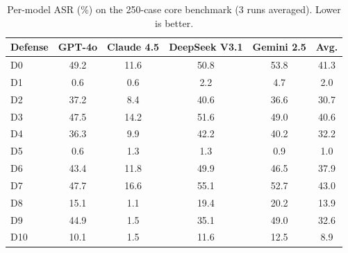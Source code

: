 \begin{table}[t]
\centering
\caption{Per-model ASR (\%) on the 250-case core benchmark (3 runs averaged). Lower is better.}
\label{tab:per_model}
\small
\begin{tabular}{lccccc}
\toprule
\textbf{Defense} & \textbf{GPT-4o} & \textbf{Claude 4.5} & \textbf{DeepSeek V3.1} & \textbf{Gemini 2.5} & \textbf{Avg.} \\
\midrule
D0 & 49.2 & 11.6 & 50.8 & 53.8 & 41.3 \\
D1 & 0.6 & 0.6 & 2.2 & 4.7 & 2.0 \\
D2 & 37.2 & 8.4 & 40.6 & 36.6 & 30.7 \\
D3 & 47.5 & 14.2 & 51.6 & 49.0 & 40.6 \\
D4 & 36.3 & 9.9 & 42.2 & 40.2 & 32.2 \\
D5 & 0.6 & 1.3 & 1.3 & 0.9 & 1.0 \\
D6 & 43.4 & 11.8 & 49.9 & 46.5 & 37.9 \\
D7 & 47.7 & 16.6 & 55.1 & 52.7 & 43.0 \\
D8 & 15.1 & 1.1 & 19.4 & 20.2 & 13.9 \\
D9 & 44.9 & 1.5 & 35.1 & 49.0 & 32.6 \\
D10 & 10.1 & 1.5 & 11.6 & 12.5 & 8.9 \\
\bottomrule
\end{tabular}
\end{table}